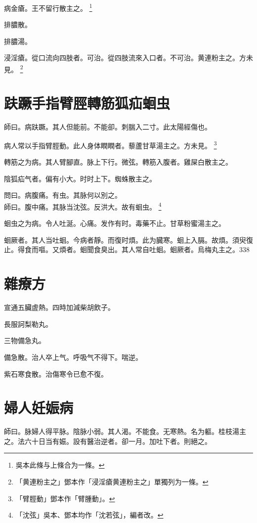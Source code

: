病金瘡。王不留行散主之。
	\footnote{吳本此條与上條合为一條。}

排膿散。

排膿湯。

浸淫瘡。從口流向四肢者。可治。從四肢流來入口者。不可治。黄連粉主之。{\scriptsize 方未見。}
	\footnote{「黄連粉主之」鄧本作「浸淫瘡黄連粉主之」單獨列为一條。}

\chapter{趺蹶手指臂脛轉筋狐疝蛔虫}

師曰。病趺蹶。其人但能前。不能卻。刺腨入二寸。此太陽經傷也。

病人常以手指臂脛動。此人身体瞤瞤者。藜蘆甘草湯主之。{\scriptsize 方未見。}
	\footnote{「臂脛動」鄧本作「臂腫動」。}

轉筋之为病。其人臂腳直。脉上下行。微弦。轉筋入腹者。雞屎白散主之。

陰狐疝气者。偏有小大。时时上下。蜘蛛散主之。

問曰。病腹痛。有虫。其脉何以別之。\\
師曰。腹中痛。其脉当沈弦。反洪大。故有蛔虫。
	\footnote{「沈弦」吳本、鄧本均作「沈若弦」，編者改。}

蛔虫之为病。令人吐涎。心痛。发作有时。毒藥不止。甘草粉蜜湯主之。

蛔厥者。其人当吐蛔。今病者靜。而復时煩。此为臓寒。蛔上入膈。故煩。須臾復止。得食而嘔。又煩者。蛔聞食臭出。其人常自吐蛔。蛔厥者。烏梅丸主之。338

\chapter{雜療方}

宣通五臟虗熱。四時加減柴胡飲子。

長服訶梨勒丸。

三物備急丸。

備急散。治人卒上气。呼吸气不得下。喘逆。

紫石寒食散。治傷寒令已愈不復。


\chapter{婦人妊娠病}

師曰。脉婦人得平脉。陰脉小弱。其人渴。不能食。无寒熱。名为軀。桂枝湯主之。法六十日当有娠。設有醫治逆者。卻一月。加吐下者。則絕之。{\wuben}

